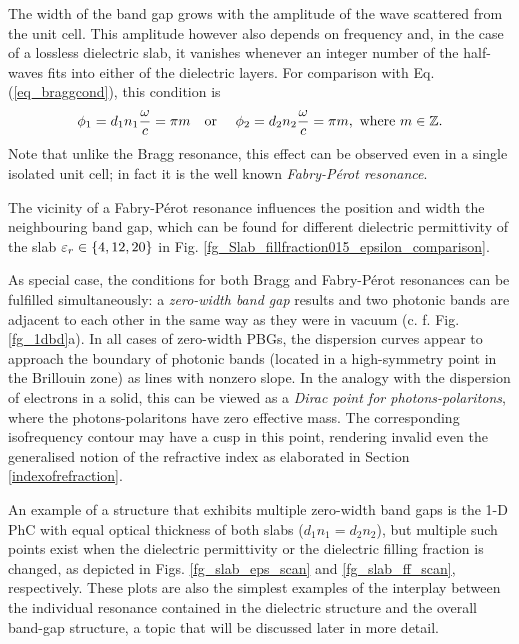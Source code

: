 The width of the band gap grows with the amplitude of the wave scattered from the unit cell. This amplitude however also depends on frequency and, in the case of a lossless dielectric slab, it vanishes whenever an integer number of the half-waves fits into either of the dielectric layers. For comparison with Eq. (\ref{eq_braggcond}), this condition is
\begin{equation} \phi_{1} = d_1 n_1 \frac{\omega}{c} = \pi m \text{\quad or \quad} \phi_{2} = d_2 n_2 \frac{\omega}{c} = \pi m, \text{ where } m\in \mathbb{Z}. \label{eq_fpcond}\end{equation}
Note that unlike the Bragg resonance, this effect can be observed even in a single isolated unit cell; in fact it is the well known \textit{Fabry-Pérot resonance}. 

The vicinity of a Fabry-Pérot resonance influences the position and width the neighbouring band gap, which can be found for different dielectric permittivity of the slab $\varepsilon_r\in\{4,12,20\}$ in Fig. \ref{fg_Slab_fillfraction015_epsilon_comparison}.

As special case, the conditions for both Bragg and Fabry-Pérot resonances can be fulfilled simultaneously: a \textit{zero-width band gap} results and two photonic bands are adjacent to each other in the same way as they were in vacuum (c. f. Fig. \ref{fg_1dbd}a). In all cases of zero-width PBGs, the dispersion curves appear to approach the boundary of photonic bands (located in a high-symmetry point in the Brillouin zone) as lines with nonzero slope. In the analogy with the dispersion of electrons in a solid, this can be viewed as a \textit{Dirac point for photons-polaritons}, where the photons-polaritons have zero effective mass. The corresponding isofrequency contour may have a cusp in this point, rendering invalid even the generalised notion of the refractive index as elaborated in Section \ref{indexofrefraction}.

An example of a structure that exhibits multiple zero-width band gaps is the 1-D PhC with equal optical thickness of both slabs ($d_1 n_1 = d_2 n_2$), but multiple such points exist when the dielectric permittivity or the dielectric filling fraction is changed, as depicted in Figs. \ref{fg_slab_eps_scan} and \ref{fg_slab_ff_scan}, respectively. These plots are also the simplest examples of the interplay between the individual resonance contained in the dielectric structure and the overall band-gap structure, a topic that will be discussed later in more detail.

